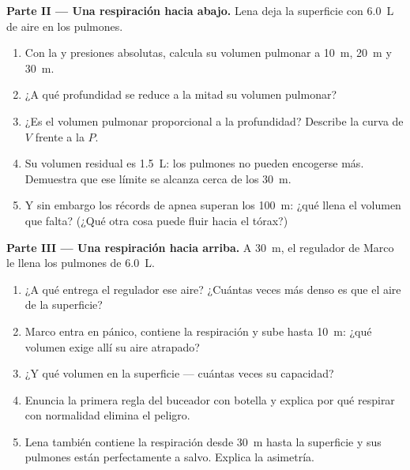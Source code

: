 \begin{problem}
\medskip
\noindent\textbf{Parte II --- Una respiración hacia abajo.}
Lena deja la superficie con \qty{6.0}{L} de aire en los pulmones.
\begin{enumerate}[resume]
  \item Con la  y presiones absolutas, calcula su volumen
        pulmonar a \qty{10}{m}, \qty{20}{m} y \qty{30}{m}.
  \item ¿A qué profundidad se reduce a la mitad su volumen pulmonar?
  \item ¿Es el volumen pulmonar proporcional a la profundidad? Describe
        la curva de $V$ frente a la  $P$.
  \item Su volumen residual es \qty{1.5}{L}: los pulmones no pueden
        encogerse más. Demuestra que ese límite se alcanza cerca de los
        \qty{30}{m}.
  \item Y sin embargo los récords de apnea superan los \qty{100}{m}:
        ¿qué llena el volumen que falta? (¿Qué otra cosa puede fluir
        hacia el tórax?)
\end{enumerate}

\medskip
\noindent\textbf{Parte III --- Una respiración hacia arriba.}
A \qty{30}{m}, el regulador de Marco le llena los pulmones de
\qty{6.0}{L}.
\begin{enumerate}[resume]
  \item ¿A qué  entrega el regulador ese aire? ¿Cuántas veces más
        denso es que el aire de la superficie?
  \item Marco entra en pánico, contiene la respiración y sube hasta
        \qty{10}{m}: ¿qué volumen exige allí su aire atrapado?
  \item ¿Y qué volumen en la superficie --- cuántas veces su capacidad?
  \item Enuncia la primera regla del buceador con botella y explica por
        qué respirar con normalidad elimina el peligro.
  \item Lena también contiene la respiración desde \qty{30}{m} hasta la
        superficie y sus pulmones están perfectamente a salvo. Explica
        la asimetría.
\end{enumerate}


\end{problem}

